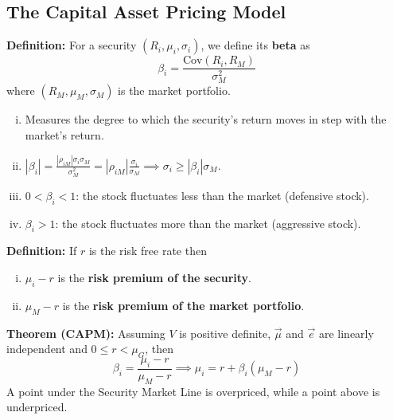 \subsection{The Capital Asset Pricing Model}
\textbf{Definition: } For a security \((R_i, \mu_i, \sigma_i)\), we define its \textbf{beta} as
\begin{equation*}
    \beta_i = \frac{\text{Cov}(R_i, R_M)}{\sigma_M^2}
\end{equation*}
where \((R_M, \mu_M, \sigma_M)\) is the market portfolio.
\begin{enumerate}[i.]
    \item Measures the degree to which the security's return moves in step with the market's return.

    \item \(|\beta_i| = \frac{|\rho_{iM}|\sigma_i \sigma_M}{\sigma_M^2} = |\rho_{iM}|\frac{\sigma_i}{\sigma_M} \implies \sigma_i \ge |\beta_i|\sigma_M\).

    \item \(0 < \beta_i < 1\): the stock fluctuates less than the market (defensive stock).

    \item \(\beta_i > 1\): the stock fluctuates more than the market (aggressive stock).
\end{enumerate}

\textbf{Definition: } If \(r\) is the risk free rate then
\begin{enumerate}[i.]
    \item \(\mu_i - r\) is the \textbf{risk premium of the security}.

    \item \(\mu_M - r\) is the \textbf{risk premium of the market portfolio}.
\end{enumerate}

\begin{framed}
\textbf{Theorem (CAPM): } Assuming \(V\) is positive definite, \(\vec{\mu}\) and \(\vec{e}\) are linearly independent and \(0 \le r < \mu_G\), then
\begin{equation*}
    \beta_i = \frac{\mu_i - r}{\mu_M - r} \implies \mu_i = r + \beta_i(\mu_M - r)
\end{equation*}
A point under the Security Market Line is overpriced, while a point above is underpriced.
\end{framed}

